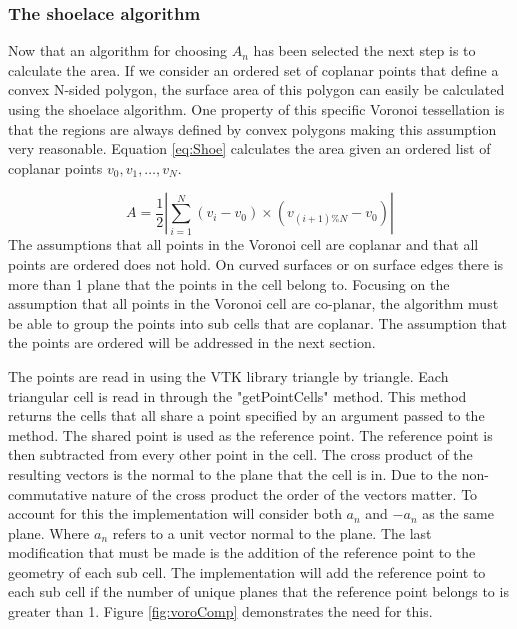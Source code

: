 \subsubsection*{The shoelace algorithm}
Now that an algorithm for choosing $A_n$ has been selected the next step is to calculate the area. If we consider an ordered set of coplanar points that define a convex N-sided polygon, the surface area of this polygon can easily be calculated using the shoelace algorithm. One property of this specific Voronoi tessellation is that the regions are always defined by convex polygons making this assumption very reasonable. Equation \ref{eq:Shoe} calculates the area given an ordered list of coplanar points $v_0, v_1, \dots, v_{N}$.

\begin{equation}
    A = \frac{1}{2}|\sum_{i=1}^{N}(v_i - v_0) \times (v_{(i+1) \% N} - v_0) |
    \label{eq:Shoe}
\end{equation}
The assumptions that all points in the Voronoi cell are coplanar and that all points are ordered does not hold. On curved surfaces or on surface edges there is more than 1 plane that the points in the cell belong to. Focusing on the assumption that all points in the Voronoi cell are co-planar, the algorithm must be able to group the points into sub cells that are coplanar. The assumption that the points are ordered will be addressed in the next section. \par
The points are read in using the VTK library triangle by triangle. Each triangular cell is read in through the "getPointCells" method. This method returns the cells that all share a point specified by an argument passed to the method. The shared point is used as the reference point. The reference point is then subtracted from every other point in the cell. The cross product of the resulting vectors is the normal to the plane that the cell is in. Due to the non-commutative nature of the cross product the order of the vectors matter. To account for this the implementation will consider both $a_n$ and $-a_n$ as the same plane. Where $a_n$ refers to a unit vector normal to the plane. The last modification that must be made is the addition of the reference point to the geometry of each sub cell. The implementation will add the reference point to each sub cell if the number of unique planes that the reference point belongs to is greater than 1. Figure \ref{fig:voroComp} demonstrates the need for this.

